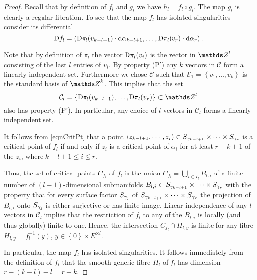 \begin{proof}
Recall that by definition of $f_l$ and $g_l$ we have $h_l=f_l\circ g_l$. The map $g_l$ is clearly a regular fibration. To see that the map $f_l$ has isolated singularities consider its differential
 \begin{equation}
  {\rm D} f_l = \left({\rm D} \pi_l (v_{k-l+1})\cdot \mathrm{d} \alpha_{k-l+1},   \dots  ,{\rm D}\pi_l(v_r) \cdot \mathrm{d} \alpha_r\right).
 \label{eqnCritPt} 
 \end{equation}

Note that by definition of $\pi_l$ the vector ${\rm D} \pi_l(v_i)$ is the vector in $\ZZ^{l}$ consisting of the last $l$ entries of $v_i$. By property (P') any $k$ vectors in $\mathcal{C}$ form a linearly independent set. Furthermore we chose $\mathcal{C}$ such that $\mathcal{E}_1= \left\{v_1,\dots, v_k\right\}$ is the standard basis of $\ZZ^k$. This implies that the set
\[
\mathcal{C}_l = \left\{ \D \pi_l (v_{k-l+1}), \dots, \D\pi_l(v_r)\right\} \subset \ZZ^l
\]
also has property (P'). In particular, any choice of $l$ vectors in $\mathcal{C}_l$ forms a linearly independent set.

It follows from \eqref{eqnCritPt} that a point $(z_{k-l+1},\cdots, z_r)\in  S_{\gamma_{k-l+1}}\times \cdots \times S_{\gamma_r}$ is a critical point of $f_l$ if and only if $z_i$ is a critical point of $\alpha_i$ for at least $r-k+1$ of the $z_i$, where $k-l+1\leq i\leq r$.

Thus, the set of critical points $C_{f_l}$ of $f_l$ is the union $C_{f_l}=\bigcup \limits_{i\in I_l} B_{l,i}$ of a finite number of $(l-1)$-dimensional submanifolds $B_{l,i}\subset S_{\gamma_{k-l+1}}\times \cdots \times S_{\gamma_r}$ with the property that for every surface factor $S_{\gamma_j}$ of $S_{\gamma_{k-l+1}}\times \cdots \times S_{\gamma_r}$ the projection of $B_{l,i}$ onto $S_{\gamma_j}$ is either surjective or has finite image. Linear independence of any $l$ vectors in $\mathcal{C}_l$ implies that the restriction of $f_l$ to any of the $B_{l,i}$ is locally (and thus globally) finite-to-one. Hence, the intersection $C_{f_l}\cap H_{l,y}$ is finite for any fibre $H_{l,y}=f_l^{-1}(y)$, $y\in \left\{0\right\}\times E^{\times l}$. 

In particular, the map $f_l$ has isolated singularities. It follows immediately from the definition of $f_l$ that the smooth generic fibre $H_l$ of $f_l$ has dimension $r-(k-l)- l=r-k$.
\end{proof}


